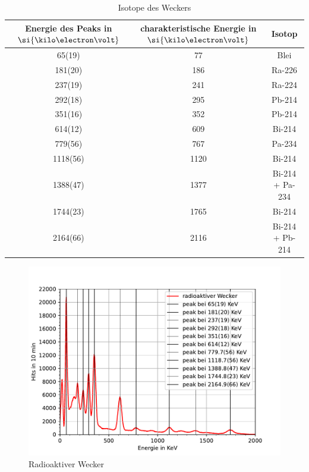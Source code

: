\documentclass[11pt, a4paper]{article}
\begin{document}
    \begin{table}
        \centering
        \begin{tabular}{c|c|c}
            
            Energie des Peaks in $\si{\kilo\electron\volt}$ & charakteristische Energie in $\si{\kilo\electron\volt}$ & Isotop \\ \hline
            65(19) & 77 & Blei \\ \hline
            181(20) & 186 & Ra-226 \\ \hline
            237(19) & 241 & Ra-224 \\ \hline
            292(18) & 295 & Pb-214 \\ \hline
            351(16) & 352 & Pb-214 \\ \hline
            614(12) & 609 & Bi-214 \\ \hline
            779(56) & 767 & Pa-234 \\ \hline
            1118(56) & 1120 & Bi-214 \\ \hline
            1388(47) & 1377 & Bi-214 + Pa-234 \\ \hline
            1744(23) & 1765 & Bi-214 \\ \hline
            2164(66) & 2116 & Bi-214 + Pb-214 \\ \hline


            
        \end{tabular}
        \caption{Isotope des Weckers}
        \label{tab:Weck}
    \end{table}


    \begin{figure}[!h]
        \centering
        \includegraphics[width=\textwidth]{Plots/Wecker.pdf}
        \caption{Radioaktiver Wecker}
        \label{fig:Wecker}
    \end{figure}
\end{document}
